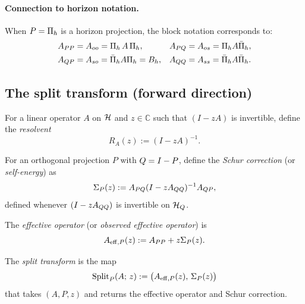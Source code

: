 \paragraph{Connection to horizon notation.}
When $P = \CCPi{h}$ is a horizon projection, the block notation corresponds to:
\begin{align*}
\CCBlockPP{A} &= A_{oo} = \CCRestr{A}{h}, &
\CCBlockPQ{A} &= A_{os} = \CCPi{h} A \CCPibar{h}, \\
\CCBlockQP{A} &= A_{so} = \CCPibar{h} A \CCPi{h} = \CCLeak{A}{h}, &
\CCBlockQQ{A} &= A_{ss} = \CCPibar{h} A \CCPibar{h}.
\end{align*}

\subsection{The split transform (forward direction)}

\begin{definition}[Resolvent]
\label{def:resolvent}
For a linear operator $A$ on $\cH$ and $z \in \mathbb{C}$ such that $(I - zA)$ is invertible, define the \emph{resolvent}
\[
R_A(z) := (I - zA)^{-1}.
\]
\end{definition}

\begin{definition}
\label{def:schur-correction}
For an orthogonal projection $P$ with $\CCComp = I - P$, define the \emph{Schur correction} (or \emph{self-energy}) as
\[
\CCSigmaP{P}{z} := \CCBlockPQ{A} (I - z \CCBlockQQ{A})^{-1} \CCBlockQP{A},
\]
defined whenever $(I - z \CCBlockQQ{A})$ is invertible on $\cH_{\CCComp}$.
\end{definition}

\begin{definition}
\label{def:effective-operator}
The \emph{effective operator} (or \emph{observed effective operator}) is
\[
\CCAeff{A}{P}(z) := \CCBlockPP{A} + z \CCSigmaP{P}{z}.
\]
\end{definition}

\begin{definition}
\label{def:split-transform}
The \emph{split transform} is the map
\[
\CCSplit{P}{A}{z} := \bigl( \CCAeff{A}{P}(z),\, \CCSigmaP{P}{z} \bigr)
\]
that takes $(A, P, z)$ and returns the effective operator and Schur correction.
\end{definition}

